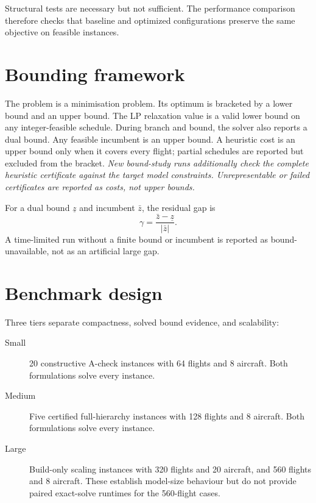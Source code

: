 Structural tests are necessary but not sufficient. The performance comparison
therefore checks that baseline and optimized configurations preserve the same
objective on feasible instances.

\section{Bounding framework}

The problem is a minimisation problem. Its optimum is bracketed by a lower
bound and an upper bound. The LP relaxation value is a valid lower bound on any
integer-feasible schedule. During branch and bound, the solver also reports a
dual bound. Any feasible incumbent is an upper bound. A heuristic cost is an
upper bound only when it covers every flight; partial schedules are reported
but excluded from the bracket. \textit{New bound-study runs additionally check
the complete heuristic certificate against the target model constraints.
Unrepresentable or failed certificates are reported as costs, not upper bounds.}

For a dual bound $\underline{z}$ and incumbent $\bar z$, the residual gap is
\begin{equation}
    \gamma = \frac{\bar z-\underline{z}}{|\bar z|}.
    \label{eq:strength_gap}
\end{equation}
A time-limited run without a finite bound or incumbent is reported as
bound-unavailable, not as an artificial large gap.

\section{Benchmark design}

Three tiers separate compactness, solved bound evidence, and scalability:
\begin{description}
    \item[Small] 20 constructive A-check instances with 64 flights and 8
    aircraft. Both formulations solve every instance.
    \item[Medium] Five certified full-hierarchy instances with 128 flights and
    8 aircraft. Both formulations solve every instance.
    \item[Large] Build-only scaling instances with 320 flights and 20 aircraft,
    and 560 flights and 8 aircraft. These establish model-size behaviour but do
    not provide paired exact-solve runtimes for the 560-flight cases.
\end{description}

